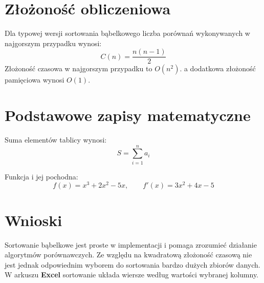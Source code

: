 \section{Złożoność obliczeniowa}

Dla typowej wersji sortowania bąbelkowego liczba porównań wykonywanych
w najgorszym przypadku wynosi:
\begin{equation}
    C(n) = \frac{n(n-1)}{2}
\end{equation}
Złożoność czasowa w najgorszym przypadku to \(O(n^2)\).
a dodatkowa złożoność pamięciowa wynosi \(O(1)\).
\section{Podstawowe zapisy matematyczne}
Suma elementów tablicy wynosi:
\[
    S = \sum_{i=1}^{n} a_i
\]

Funkcja i jej pochodna:
\[
    f(x) = x^3 + 2x^2 -5x, \qquad f'(x) = 3x^2 + 4x - 5
\]
\section{Wnioski}

Sortowanie bąbelkowe jest proste w implementacji i pomaga zrozumieć działanie
algorytmów porównawczych. Ze względu na kwadratową złożoność czasową nie jest
jednak odpowiednim wyborem do sortowania bardzo dużych zbiorów danych.
W arkuszu \textbf{Excel} sortowanie układa wiersze według wartości wybranej kolumny.